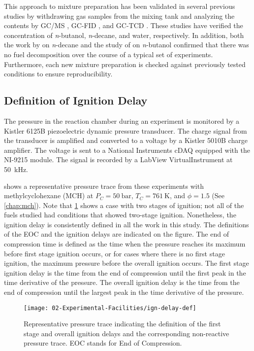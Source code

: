 \documentclass[../main.tex]{subfiles}
\begin{document}
This approach to mixture preparation has been validated in several previous
studies by withdrawing gas samples from the mixing tank and analyzing the
contents by GC/MS \cite{Weber2011}, GC-FID \cite{Kumar2009}, and GC-TCD
\cite{Das2012}. These studies have verified the concentration of
\textit{n}-butanol, \textit{n}-decane, and water, respectively. In addition,
both the work by \textcite{Kumar2009} on \textit{n}-decane and the study of
\textcite{Weber2011} on \textit{n}-butanol confirmed that there was no fuel
decomposition over the course of a typical set of experiments. Furthermore,
each new mixture preparation is checked against previously tested
conditions to ensure reproducibility.

\subsection{Definition of Ignition Delay}
\label{sec:ign-delay-def}

The pressure in the reaction chamber during an experiment is monitored by a
Kistler 6125B piezoelectric dynamic pressure transducer. The charge signal from the
transducer is amplified and converted to a voltage by a Kistler 5010B charge amplifier.
The voltage is sent to a National Instruments cDAQ equipped with the NI-9215 module.
The signal is recorded by a LabView VirtualInstrument at \SI{50}{\kilo\hertz}.

 shows a representative pressure trace from
these experiments with methylcyclohexane (MCH) at $P_C= \SI{50}{\bar}$, $T_C=\SI{761}{\kelvin}$,
and $\phi=\num{1.5}$ (See \cref{chap:mch}). Note that \cref{fig:ig-delay-def}
shows a case with two stages of ignition; not all of the fuels studied
had conditions that showed two-stage ignition. Nonetheless, the ignition
delay is consistently defined in all the work in this study. The
definitions of the EOC and the ignition delays are indicated on the figure.
The end of compression time is defined as the time when the pressure
reaches its maximum before first stage ignition occurs, or for cases
where there is no first stage ignition, the maximum pressure before
the overall ignition occurs. The first stage ignition delay is the time
from the end of compression until the first peak in the time derivative
of the pressure. The overall ignition delay is the time from the end of
compression until the largest peak in the time derivative of the pressure.

\begin{figure}
    \texttt{[image: 02-Experimental-Facilities/ign-delay-def]}
    \caption{Representative pressure trace indicating the definition of
    the first stage and overall ignition delays and the corresponding
    non-reactive pressure trace. EOC stands for End of Compression.}
    \label{fig:ig-delay-def}
\end{figure}
\end{document}
